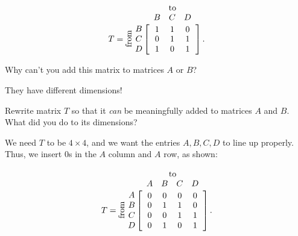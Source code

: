 \documentclass[../gatm_answers.tex]{subfiles}
\begin{document}
$$T = \rotatebox[origin=c]{90}{from}\;\,
  \begin{array}{@{}c@{}}
    \rowind{B} \\ \rowind{C} \\ \rowind{D}
  \end{array}
  \mathop{\left[
  \begin{array}{ccc}
     \colind{1}{B}  &  \colind{1}{C}  &  \colind{0}{D} \\
     0 & 1 & 1 \\
     1 & 0 & 1 \\
  \end{array}
  \right]}^{
  \begin{array}{@{}c@{}}
    \rowind{\text{to}} \\ \mathstrut
  \end{array}
  }.$$

\begin{inner_problem}[start=1]
\item Why can't you add this matrix to matrices $A$ or $B$?
\end{inner_problem}

They have different dimensions!

\begin{inner_problem}
\item Rewrite matrix $T$ so that it \textit{can} be meaningfully added to matrices $A$ and $B$. What did you do to its dimensions?
\end{inner_problem}

We need $T$ to be $4\times 4$, and we want the entries $A,B,C,D$ to line up properly. Thus, we insert $0$s in the $A$ column and $A$ row, as shown:

$$T = \rotatebox[origin=c]{90}{from}\;\,
  \begin{array}{@{}c@{}}
    \rowind{A} \\ \rowind{B} \\ \rowind{C} \\ \rowind{D}
  \end{array}
  \mathop{\left[
  \begin{array}{cccc}
     \colind{0}{A} & \colind{0}{B}  &  \colind{0}{C}  &  \colind{0}{D} \\
     0 & 1 & 1 & 0 \\
     0 & 0 & 1 & 1 \\
     0 & 1 & 0 & 1 \\
  \end{array}
  \right]}^{
  \begin{array}{@{}c@{}}
    \rowind{\text{to}} \\ \mathstrut
  \end{array}
  }.$$
\end{document}
